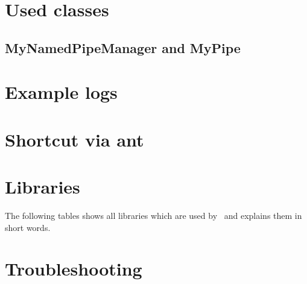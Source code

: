 \appendix
\chapter{Used classes}
      \section{MyNamedPipeManager and MyPipe}
	\setJavaCodeListing
	\lstset{caption=MyNamedPipeManager.java}
	

	\setJavaCodeListing
	\lstset{caption=MyPipe.java}
	

\chapter{Example logs}
\chapter{Shortcut via ant}
\chapter{Libraries}
      The following tables shows all libraries which are used by \Kieker\ and explains them in short words.
      
\chapter{Troubleshooting}
